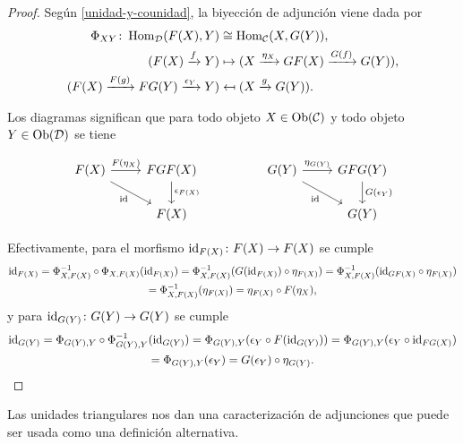 \documentclass{article}
\numberwithin{equation}{section}
\theoremstyle{definition}
\begin{document}
\begin{proof}
  Según \ref{unidad-y-counidad}, la biyección de adjunción viene dada por
  \begin{align*}
    \Phi_{XY}\colon\operatorname{Hom}_\mathcal{D} (F (X), Y) & \cong \operatorname{Hom}_\mathcal{C} (X, G (Y)),\\
    (F (X) \xrightarrow{f} Y) & \mapsto (X\xrightarrow{\eta_X} GF (X) \xrightarrow{G (f)} G (Y)),\\
    (F (X)\xrightarrow{F (g)} FG (Y) \xrightarrow{\epsilon_Y} Y) & \mapsfrom (X\xrightarrow{g} G (Y)).
  \end{align*}

  Los diagramas  significan que para
  todo objeto $X\in \operatorname{Ob} (\mathcal{C})$ y todo objeto $Y\in \operatorname{Ob} (\mathcal{D})$ se
  tiene

  \[ \begin{tikzcd}
      F (X) \ar{r}{F (\eta_X)}\ar{dr}[swap]{\idid} & FGF (X)\ar{d}{\epsilon_{F (X)}} & & G (Y) \ar{r}{\eta_{G (Y)}}\ar{dr}[swap]{\idid} & GFG (Y)\ar{d}{G (\epsilon_Y)} \\
      & F (X) && & G (Y)
    \end{tikzcd} \]

  Efectivamente, para el morfismo $\mathrm{id}_{F (X)}\colon F (X)\to F (X)$ se cumple
  \begin{multline*}
    \mathrm{id}_{F (X)} =
    \Phi_{X,F(X)}^{-1}\circ\Phi_{X,F(X)} (\mathrm{id}_{F (X)}) =
    \Phi_{X,F(X)}^{-1} (G (\mathrm{id}_{F (X)}) \circ \eta_{F (X)}) =
    \Phi_{X,F(X)}^{-1} (\mathrm{id}_{GF (X)} \circ \eta_{F (X)}) \\
  = \Phi_{X,F(X)}^{-1} (\eta_{F (X)}) = \eta_{F (X)}\circ F (\eta_X),
  \end{multline*}
  y para $\mathrm{id}_{G (Y)}\colon G (Y)\to G (Y)$ se cumple
  \begin{multline*}
    \mathrm{id}_{G (Y)} =
    \Phi_{G(Y),Y}\circ\Phi_{G(Y),Y}^{-1} (\mathrm{id}_{G (Y)}) =
    \Phi_{G(Y),Y} (\epsilon_Y\circ F (\mathrm{id}_{G (Y)})) =
    \Phi_{G(Y),Y} (\epsilon_Y\circ \mathrm{id}_{FG (X)}) \\
  = \Phi_{G(Y),Y} (\epsilon_Y) = G (\epsilon_Y)\circ \eta_{G (Y)}.
  \end{multline*}
\end{proof}

Las unidades triangulares nos dan una caracterización de adjunciones que puede
ser usada como una definición alternativa.
\end{document}
